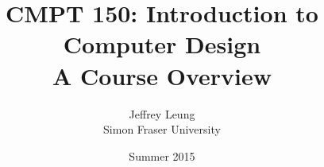\documentclass[titlepage]{article}
\title{CMPT 150: Introduction to Computer Design \\\medskip \Large A Course Overview}
\author{Jeffrey Leung \\ Simon Fraser University}
\date{Summer 2015}
\begin{document}
	\begin{comment}
	\begin{titlepage}
		\begin{center}
	
			Simon Fraser University\\
			\vspace{3cm}
			\textsc{\LARGE CMPT 150:\\\vspace{.5cm}Introduction to Computer Design}\\
			\vspace{1.5cm}
			\textsc{\Large A Course Overview}\\
			\vspace{7cm}
			\large Jeffrey Leung

		\end{center}
	\end{titlepage}
	\end{comment}

	\maketitle
	\tableofcontents
	\clearpage
	
	
	
	
	
\end{document}
